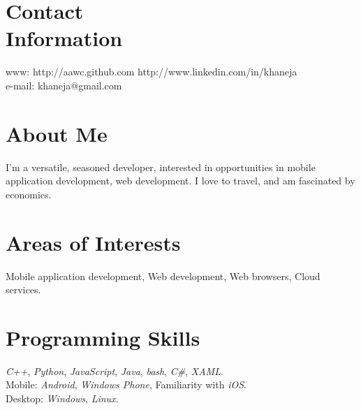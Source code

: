 \documentclass[margin,line]{resume}
\begin{document}
	\begin{resume}

	\section{\mysidestyle Contact\\Information}

	www: http://aawc.github.com \hfill http://www.linkedin.com/in/khaneja\vspace{0mm}\\\vspace{0mm}%
	e-mail: khaneja@gmail.com    \hfill \vspace{0mm}%

	\section{\mysidestyle About Me}
	I'm a versatile, seasoned developer, interested in opportunities in mobile application development, web development. I love to travel, and am fascinated by economics.
	\section{\mysidestyle Areas of Interests}
	Mobile application development, Web development, Web browsers, Cloud services.
	\section{\mysidestyle Programming Skills}
  \textit{C++}, \textit{Python}, \textit{JavaScript}, \textit{Java}, \textit{bash}, \textit{C\#}, \textit{XAML}.\\
	Mobile: \textit{Android}, \textit{Windows Phone}, Familiarity with \textit{iOS}.\\
	Desktop: \textit{Windows}, \textit{Linux}.


\end{resume}
\end{document}

